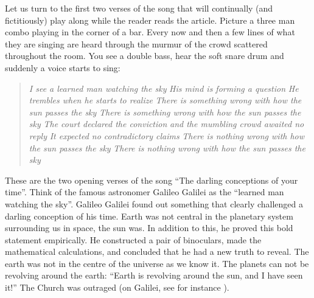 Let us turn to the f\hbox{}irst two verses of the song that will continually (and
f\hbox{}ictitiously) play along while the reader reads the article. Picture a three man
combo playing in the corner of a bar. Every now and then a few lines of what
they are singing are heard through the murmur of the crowd scattered throughout
the room. You see a double bass, hear the soft snare drum and suddenly a voice
starts to sing: 

\begin{quote}
\textit{I see a learned man watching the sky}\newline
\textit{His mind is forming a question}\newline
\textit{He trembles when he starts to realize}\newline
\textit{There is something wrong with how the sun passes the sky}\newline
\textit{There is something wrong with how the sun passes the sky}\newline
\newline
\textit{The court declared the conviction}\newline
\textit{and the mumbling crowd awaited no reply}\newline
\textit{It expected no contradictory claims}\newline
\textit{There is nothing wrong with how the sun passes the sky}\newline
\textit{There is nothing wrong with how the sun passes the sky}
\end{quote}

These are the two opening verses of the song ``The darling conceptions of your
time''. Think of the famous astronomer Galileo Galilei as the ``learned man
watching the sky''. Galileo Galilei found out something that clearly challenged
a darling conception of his time. Earth was not central in the planetary system
surrounding us in space, the sun was. In addition to this, he proved this bold
statement empirically. He constructed a pair of binoculars, made the
mathematical calculations, and concluded that he had a new truth to reveal. The
earth was not in the centre of the universe as we know it. The planets can not
be revolving around the earth: ``Earth is revolving around the sun, and I have
seen it!'' The Church was outraged (on Galilei, see for instance
\cite{darling-naess07}).

